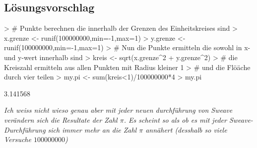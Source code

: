 \subsection*{Lösungsvorschlag}
\begin{Schunk}
\begin{Sinput}
> # Punkte berechnen die innerhalb der Grenzen des Einheitskreises sind
> x.grenze <- runif(100000000,min=-1,max=1)
> y.grenze <- runif(100000000,min=-1,max=1)
> # Nun die Punkte ermitteln die sowohl in x- und y-wert innerhalb sind
> kreis <- sqrt(x.grenze^2 + y.grenze^2)
> # die Kreiszahl ermitteln aus allen Punkten mit Radius kleiner 1
> # und die Flöäche durch vier teilen
> my.pi <- sum(kreis<1)/100000000*4
> my.pi
\end{Sinput}
\begin{Soutput}
[1] 3.141568
\end{Soutput}
\end{Schunk}

\emph{Ich weiss nicht wieso genau aber mit jeder neuen durchführung von Sweave
verändern sich die Resultate der Zahl $\pi$. Es scheint so als ob es mit jeder
Sweave-Durchführung sich immer mehr an die Zahl $\pi$ annähert (desshalb so
viele Versuche $100000000$)}
